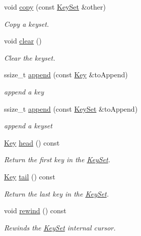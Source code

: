\begin{DoxyCompactItemize}
void \mbox{\hyperlink{classkdb_1_1KeySet_a28fd33fdaecf1d57d4dddac7058f5d38}{copy}} (const \mbox{\hyperlink{classkdb_1_1KeySet}{Key\+Set}} \&other)
\begin{DoxyCompactList}\small\item\em Copy a keyset. \end{DoxyCompactList}\item 
void \mbox{\hyperlink{classkdb_1_1KeySet_a38f5159e39758aa632421d2fe7440633}{clear}} ()
\begin{DoxyCompactList}\small\item\em Clear the keyset. \end{DoxyCompactList}\item 
ssize\+\_\+t \mbox{\hyperlink{classkdb_1_1KeySet_a0d4b2f3aa9f58d10053561135b50233e}{append}} (const \mbox{\hyperlink{classkdb_1_1Key}{Key}} \&to\+Append)
\begin{DoxyCompactList}\small\item\em append a key \end{DoxyCompactList}\item 
ssize\+\_\+t \mbox{\hyperlink{classkdb_1_1KeySet_ac9cbdc933d7171037d47c6d4d78595d1}{append}} (const \mbox{\hyperlink{classkdb_1_1KeySet}{Key\+Set}} \&to\+Append)
\begin{DoxyCompactList}\small\item\em append a keyset \end{DoxyCompactList}\item 
\mbox{\hyperlink{classkdb_1_1Key}{Key}} \mbox{\hyperlink{classkdb_1_1KeySet_a1aca3689ed08cbc909976cdf874cfb59}{head}} () const
\begin{DoxyCompactList}\small\item\em Return the first key in the \mbox{\hyperlink{classkdb_1_1KeySet}{Key\+Set}}. \end{DoxyCompactList}\item 
\mbox{\hyperlink{classkdb_1_1Key}{Key}} \mbox{\hyperlink{classkdb_1_1KeySet_a16deed50e0d8cfee023d4423a119df51}{tail}} () const
\begin{DoxyCompactList}\small\item\em Return the last key in the \mbox{\hyperlink{classkdb_1_1KeySet}{Key\+Set}}. \end{DoxyCompactList}\item 
void \mbox{\hyperlink{classkdb_1_1KeySet_a5bc5a16a726e959adaf3cf8506e7b849}{rewind}} () const
\begin{DoxyCompactList}\small\item\em Rewinds the \mbox{\hyperlink{classkdb_1_1KeySet}{Key\+Set}} internal cursor. \end{DoxyCompactList}\item 

\end{DoxyCompactItemize}
